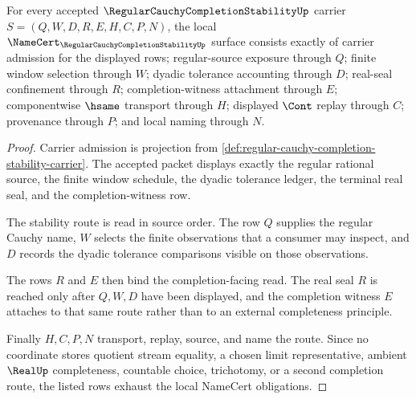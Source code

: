 \begin{theorem}
\label{thm:regular-cauchy-completion-stability-namecert-obligations}
For every accepted $\RegularCauchyCompletionStabilityUp$ carrier $S=(Q,W,D,R,E,H,C,P,N)$, the local $\NameCert_{\RegularCauchyCompletionStabilityUp}$ surface consists exactly of carrier admission for the displayed rows; regular-source exposure through $Q$; finite window selection through $W$; dyadic tolerance accounting through $D$; real-seal confinement through $R$; completion-witness attachment through $E$; componentwise $\hsame$ transport through $H$; displayed $\Cont$ replay through $C$; provenance through $P$; and local naming through $N$.
\end{theorem}
\begin{proof}
Carrier admission is projection from \autoref{def:regular-cauchy-completion-stability-carrier}. The accepted packet displays exactly the regular rational source, the finite window schedule, the dyadic tolerance ledger, the terminal real seal, and the completion-witness row.

The stability route is read in source order. The row $Q$ supplies the regular Cauchy name, $W$ selects the finite observations that a consumer may inspect, and $D$ records the dyadic tolerance comparisons visible on those observations.

The rows $R$ and $E$ then bind the completion-facing read. The real seal $R$ is reached only after $Q,W,D$ have been displayed, and the completion witness $E$ attaches to that same route rather than to an external completeness principle.

Finally $H,C,P,N$ transport, replay, source, and name the route. Since no coordinate stores quotient stream equality, a chosen limit representative, ambient $\RealUp$ completeness, countable choice, trichotomy, or a second completion route, the listed rows exhaust the local NameCert obligations.
\end{proof}

